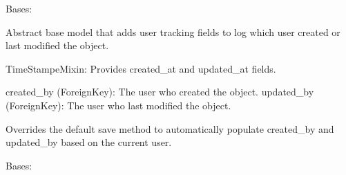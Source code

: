 \documentclass[letterpaper,10pt,english]{sphinxmanual}
\begin{document}
\begin{fulllineitems}
\label{\detokenize{core:core.models.AuditableMixin}}
\pysigstartsignatures
\pysiglinewithargsret
{}
{\sphinxparamcomma {}}
{}
\pysigstopsignatures
\sphinxAtStartPar
Bases: {\hyperref[\detokenize{core:core.models.TimeStampeMixin}]{}}

\sphinxAtStartPar
Abstract base model that adds user tracking fields to log which user created or last modified the object.
\begin{description}
\sphinxAtStartPar
TimeStampeMixin: Provides created\_at and updated\_at fields.

\sphinxAtStartPar
created\_by (ForeignKey): The user who created the object.
updated\_by (ForeignKey): The user who last modified the object.

\end{description}

\begin{fulllineitems}
\label{\detokenize{core:core.models.AuditableMixin.save}}
\pysigstartsignatures
\pysiglinewithargsret
{}
{}
{}
\pysigstopsignatures
\sphinxAtStartPar
Overrides the default save method to automatically populate
created\_by and updated\_by based on the current user.

\end{fulllineitems}


\begin{fulllineitems}
\label{\detokenize{core:core.models.AuditableMixin.Meta}}
\pysigstartsignatures
\pysigline
{}
\pysigstopsignatures
\sphinxAtStartPar
Bases: 

\begin{fulllineitems}
\label{\detokenize{core:core.models.AuditableMixin.Meta.abstract}}
\pysigstartsignatures
\pysigline
{}
\pysigstopsignatures
\end{fulllineitems}



\end{fulllineitems}
\end{fulllineitems}
\end{document}
